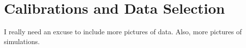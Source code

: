 %
%
%
\clearpage
\chapter{Calibrations and Data Selection}
\label{calibrations_chapter}
\label{dataselection_chapter}
I really need an excuse to include more pictures of data.  Also, more pictures of simulations.

